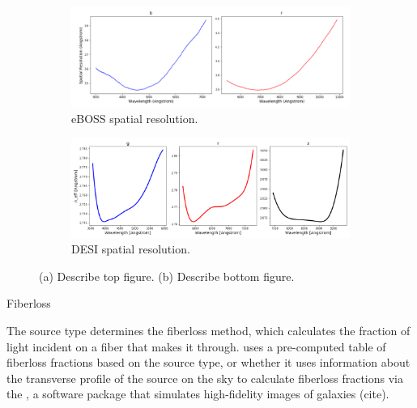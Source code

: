 \begin{figure}[h]
\centering
\begin{subfigure}[b]{0.55\textwidth}
   \includegraphics[width=14cm]{images/specsim/eboss_neff.png}
   \caption{eBOSS spatial resolution.}
   \label{fig:eboss_neff} 
\end{subfigure}

\begin{subfigure}[b]{0.55\textwidth}
   \includegraphics[width=14cm]{images/specsim/desi_neff.png}
   \caption{DESI spatial resolution.}
   \label{fig:desi_neff}
\end{subfigure}
\caption[Two numerical solutions]{(a) Describe top figure. (b) Describe bottom figure.}
\label{fig:neff}
\end{figure}

Fiberloss

The source type determines the fiberloss method, which calculates the fraction of light incident on a fiber that makes it through. uses a pre-computed table of fiberloss fractions based on the source type, or whether it uses information about the transverse profile of the source on the sky to calculate fiberloss fractions via the , a software package that simulates high-fidelity images of galaxies (cite).



